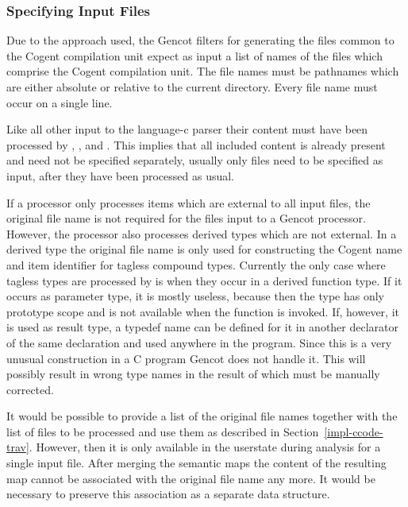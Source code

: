 \subsubsection{Specifying Input Files}

Due to the approach used, the Gencot filters for generating the files common to the Cogent compilation unit expect
as input a list of names of the files which comprise the Cogent compilation unit. The file names must be pathnames which are either 
absolute or relative to the current directory. Every file name must occur on a single line.

Like all other input to the language-c parser their content must have been processed by , 
, and . This implies that all included content is already present
and need not be specified separately, usually only  files need to be specified as input, after they have
been processed as usual.

If a processor only processes items which are external to all input files, the original file name is not required 
for the files input to a Gencot processor. However, the processor  also processes derived 
types which are not external. In a derived type the original file name is only used for constructing the Cogent name
and item identifier for tagless compound types. Currently the only case where tagless types are processed by 
 is when they occur in a derived function type. If it occurs as parameter type, it is mostly
useless, because then the type has only prototype scope and is not available when the function is invoked. If, however,
it is used as result type, a typedef name can be defined for it in another declarator of the same declaration and
used anywhere in the program. Since this is a very unusual construction in a C program Gencot does not handle it.
This will possibly result in wrong type names in the result of  which must be manually corrected.

It would be possible to provide a list of the original file names together with the list of files to be processed and
use them as described in Section~\ref{impl-ccode-trav}. However, then it is only available in the userstate during 
analysis for a single input file. After merging the semantic maps the content of the resulting map cannot be associated
with the original file name any more. It would be necessary to preserve this association as a separate data structure.

